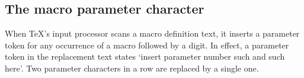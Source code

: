\documentclass[letterpaper]{book}
\begin{document}
\begin{comment}
However, only
one empty argument can be created this way: 
if the macro had been defined as
\begin{verbatim}
\def\mac#1#2\ro{ ... }
\end{verbatim}
the same call
\begin{verbatim}
\mac\ro \othermacro \stillothermacro
\end{verbatim}
will probably cause a `\n{Runaway argument?}' error message.
Explanation: the first parameter is undelimited, so the corresponding
argument is `\cs{ro}'; after that \TeX\ starts looking for a list
of tokens delimited by~\cs{ro}.
\end{comment}

\subsection{The macro parameter character}

When \TeX's input processor scans a macro definition text, it inserts
a parameter token for any occurrence of a macro
followed by a digit.  In effect, a
parameter token in the replacement text states `insert parameter
number such and such here'.  Two parameter characters in a row are
replaced by a single one.
\end{document}
